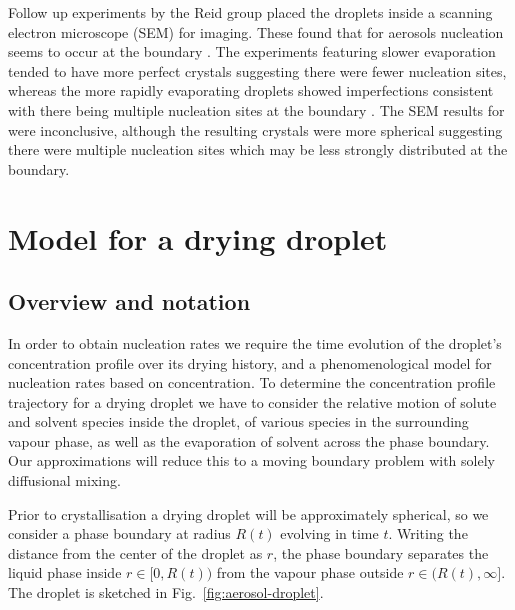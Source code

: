\documentclass[11pt,twoside]{report}
\begin{document}
Follow up experiments by the Reid group placed the droplets inside a scanning electron microscope (SEM) for imaging.
These found that for  aerosols nucleation seems to occur at the boundary%
.
The experiments featuring slower evaporation tended to have more perfect crystals suggesting there were fewer nucleation sites, whereas the more rapidly evaporating droplets showed imperfections consistent with there being multiple nucleation sites at the boundary \cite{GregsonTBD2019}.
The SEM results for  were inconclusive, although the resulting crystals were more spherical suggesting there were multiple nucleation sites which may be less strongly distributed at the boundary.

\section{Model for a drying droplet}
\label{sec:evolution}

\subsection{Overview and notation}

In order to obtain nucleation rates we require the time evolution of the droplet's concentration profile over its drying history, and a phenomenological model for nucleation rates based on concentration.
To determine the concentration profile trajectory for a drying droplet we have to consider the relative motion of solute and solvent species inside the droplet, of various species in the surrounding vapour phase, as well as the evaporation of solvent across the phase boundary.
Our approximations will reduce this to a moving boundary problem with solely diffusional mixing.

Prior to crystallisation a drying droplet will be approximately spherical, so we consider a phase boundary at radius $R(t)$ evolving in time $t$.
Writing the distance from the center of the droplet as $r$, the phase boundary separates the liquid phase inside $r \in [0, R(t))$ from the vapour phase outside $r \in (R(t), \infty]$.
The droplet is sketched in Fig.\ \ref{fig:aerosol-droplet}.
\end{document}
